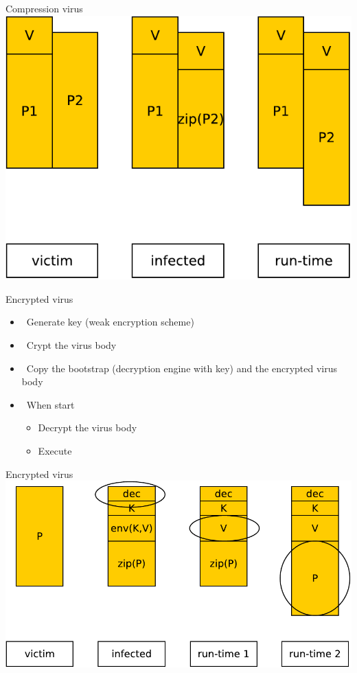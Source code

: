 \documentclass{beamer}
\begin{document}
\begin{frame}{Compression virus}
\includegraphics[width=0.8\linewidth]{compressingVirus}
\end{frame}

\begin{frame}{Encrypted virus }
  \begin{itemize}
  \item  Generate key (weak encryption scheme)
  \item  Crypt the virus body
  \item  Copy the bootstrap (decryption engine with key)
    and the encrypted virus body
  \item  When start
  \begin{itemize}
    \item Decrypt the virus body
    \item Execute
  \end{itemize}
  \end{itemize}
\end{frame}

\begin{frame}{Encrypted virus}
\includegraphics[width=0.8\linewidth]{dec}
\end{frame}
\end{document}
